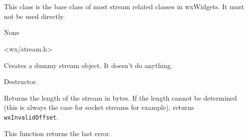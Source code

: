 \section{}\label{wxstreambase}

This class is the base class of most stream related classes in wxWidgets. It must
not be used directly.


None


<wx/stream.h>






\label{wxstreambasector}


Creates a dummy stream object. It doesn't do anything.


\label{wxstreambasedtor}


Destructor.


\label{wxstreambasegetlength}


Returns the length of the stream in bytes. If the length cannot be determined
(this is always the case for socket streams for example), returns 
\texttt{wxInvalidOffset}.



\label{wxstreambasegetlasterror}


This function returns the last error.

\twocolwidtha{5cm}
\begin{twocollist}\itemsep=0pt
\end{twocollist}



